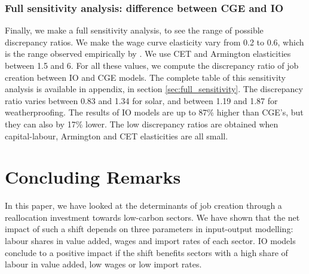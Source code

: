 \subsubsection{Full sensitivity analysis: difference between CGE and IO}
Finally, we make a full sensitivity analysis, to see the range of possible discrepancy ratios. We make the wage curve elasticity vary from 0.2 to 0.6, which is the range observed empirically by \citet{VanderWerf2008}. We use CET and Armington elasticities between 1.5 and 6. For all these values, we compute the discrepancy ratio of job creation between IO and CGE models. 
The complete table of this sensitivity analysis is available in appendix, in section \ref{sec:full_sensitivity}.
The discrepancy ratio varies between 0.83 and 1.34 for solar, and between 1.19 and 1.87 for weatherproofing. The results of IO models are up to 87\% higher than CGE's, but they can also by 17\% lower. The low discrepancy ratios are obtained when capital-labour, Armington and CET elasticities are all small.


\section{Concluding Remarks} \label{sec:conclusion4}

In this paper, we have looked at the determinants of job creation through a reallocation investment towards low-carbon sectors.
We have shown that the net impact of such a shift depends on three parameters in input-output modelling: labour shares in value added, wages and import rates of each sector.
IO models conclude to a positive impact if the shift benefits sectors with a high share of labour in value added, low wages or low import rates.

